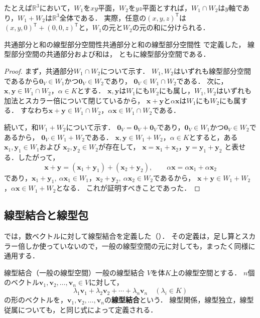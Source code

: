 たとえば$\mathbb{R}^3$において，$W_1$を$xy$平面，$W_2$を$yz$平面とすれば，$W_1\cap W_2$は$y$軸であり，$W_1+W_2$は$\mathbb{R}^3$全体である．
実際，任意の$(x,y,z)^\mathsf{T}$は$(x,y,0)^\mathsf{T}+(0,0,z)^\mathsf{T}$と，$W_1$の元と$W_2$の元の和に分けられる．

\begin{prop}{共通部分と和の線型部分空間性}{共通部分と和の線型部分空間性}
  で定義した，
  線型部分空間の共通部分および和は，
  ともに線型部分空間である．
\end{prop}

\begin{tleftbar}
\begin{proof}
  まず，共通部分$W_1\cap W_2$について示す．
  $W_1,W_2$はいずれも線型部分空間であるから$\bm{0}_V\in W_1$かつ$\bm{0}_V\in W_2$であり，
  $\bm{0}_V\in W_1\cap W_2$である．
  次に，$\bm{x},\bm{y}\in W_1\cap W_2$，$\alpha\in K$とする．
  $\bm{x},\bm{y}$は$W_1$にも$W_2$にも属し，$W_1,W_2$はいずれも加法とスカラー倍について閉じているから，
  $\bm{x}+\bm{y}$と$\alpha\bm{x}$は$W_1$にも$W_2$にも属する．
  すなわち$\bm{x}+\bm{y}\in W_1\cap W_2$，$\alpha\bm{x}\in W_1\cap W_2$である．

  続いて，和$W_1+W_2$について示す．
  $\bm{0}_V=\bm{0}_V+\bm{0}_V$であり，$\bm{0}_V\in W_1$かつ$\bm{0}_V\in W_2$であるから，
  $\bm{0}_V\in W_1+W_2$である．
  $\bm{x},\bm{y}\in W_1+W_2$，$\alpha\in K$とすると，ある$\bm{x}_1,\bm{y}_1\in W_1$および
  $\bm{x}_2,\bm{y}_2\in W_2$が存在して，
  $\bm{x}=\bm{x}_1+\bm{x}_2$，$\bm{y}=\bm{y}_1+\bm{y}_2$
  と表せる．したがって，
  \[
    \bm{x}+\bm{y}
    =(\bm{x}_1+\bm{y}_1)+(\bm{x}_2+\bm{y}_2),
    \qquad
    \alpha\bm{x}
    =\alpha\bm{x}_1+\alpha\bm{x}_2
  \]
  であり，$\bm{x}_1+\bm{y}_1,~\alpha\bm{x}_1\in W_1$，$\bm{x}_2+\bm{y}_2,~\alpha\bm{x}_2\in W_2$であるから，
  $\bm{x}+\bm{y}\in W_1+W_2$，$\alpha\bm{x}\in W_1+W_2$となる．
  これが証明すべきことであった．
\end{proof}
\end{tleftbar}

\subsection{線型結合と線型包}

では，数ベクトルに対して線型結合を定義した（）．
その定義は，足し算とスカラー倍しか使っていないので，一般の線型空間の元に対しても，まったく同様に通用する．

\begin{definition}{線型結合（一般の線型空間）}{一般の線型結合}
  $V$を体$K$上の線型空間とする．
  $n$個のベクトル$\bm{v}_1, \bm{v}_2, \dots, \bm{v}_n \in V$に対して，
  \[
    \lambda_1 \bm{v}_1 + \lambda_2 \bm{v}_2 + \cdots + \lambda_n \bm{v}_n
    \quad (\lambda_i \in K)
  \]
  の形のベクトルを，$\bm{v}_1, \bm{v}_2, \dots, \bm{v}_n$の\textbf{線型結合}という．
  線型関係，線型独立，線型従属についても，と同じ式によって定義される．
\end{definition}


